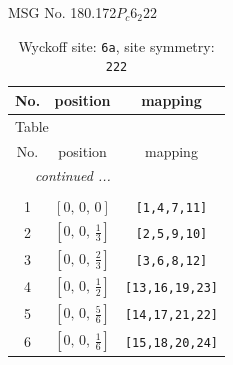 \documentclass[fleqn,8pt]{jsarticle}
\begin{document}
\setcounter{MaxMatrixCols}{32}

\renewcommand{\tablename}{Table~}
\renewcommand{\figurename}{Figure~}
\begin{center}
\LARGE
MSG No. 180.172\quad$P_{c}6_{2}22$
\end{center}
\renewcommand{\arraystretch}{1.2}
\begin{longtable}{ccc}
\caption{Wyckoff site: {\tt 6a}, site symmetry: {\tt 222}}
 \\
 \hline \hline
No. & position & mapping \\ \hline \endfirsthead

\multicolumn{2}{l}{\tablename\ \thetable{}} \\
 \hline \hline
No. & position & mapping \\ \hline \endhead

 \hline \hline
\multicolumn{2}{r}{\footnotesize\it continued ...} \\ \endfoot

 \hline \hline
\multicolumn{2}{r}{} \\ \endlastfoot

1 & $\left[ 0,\, 0,\, 0 \right]$ & {\tt [1,4,7,11]} \\ \hline
2 & $\left[ 0,\, 0,\, \frac{1}{3} \right]$ & {\tt [2,5,9,10]} \\ \hline
3 & $\left[ 0,\, 0,\, \frac{2}{3} \right]$ & {\tt [3,6,8,12]} \\ \hline
4 & $\left[ 0,\, 0,\, \frac{1}{2} \right]$ & {\tt [13,16,19,23]} \\ \hline
5 & $\left[ 0,\, 0,\, \frac{5}{6} \right]$ & {\tt [14,17,21,22]} \\ \hline
6 & $\left[ 0,\, 0,\, \frac{1}{6} \right]$ & {\tt [15,18,20,24]} \\
\end{longtable}
\renewcommand{\arraystretch}{1.2}
\end{document}
